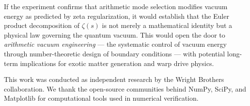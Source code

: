 \documentclass[aps,prd,twocolumn,superscriptaddress,nofootinbib]{revtex4-2}
\begin{document}
If the experiment confirms that arithmetic mode selection
modifies vacuum energy as predicted by zeta regularization,
it would establish that the Euler product decomposition of
$\zeta(s)$ is not merely a mathematical identity but a physical
law governing the quantum vacuum. This would open the door to
\emph{arithmetic vacuum engineering} --- the systematic control
of vacuum energy through number-theoretic design of boundary
conditions --- with potential long-term implications for
exotic matter generation and warp drive physics.

\begin{acknowledgments}
This work was conducted as independent research by the
Wright Brothers collaboration. We thank the open-source
communities behind NumPy, SciPy, and Matplotlib for
computational tools used in numerical verification.
\end{acknowledgments}
\end{document}
